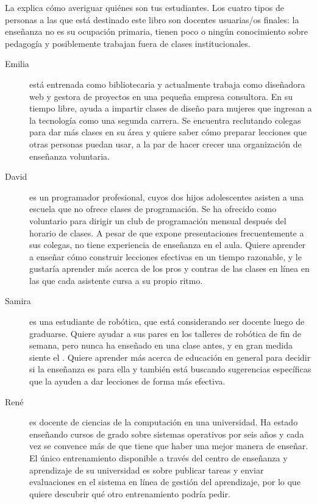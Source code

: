 
La  explica cómo averiguar quiénes son tus estudiantes. 
Los cuatro tipos de personas a las que está destinado este libro son docentes usuarias/os finales: 
la enseñanza no es su ocupación primaria, tienen poco o ningún conocimiento sobre pedagogía y 
posiblemente trabajan fuera de clases institucionales.

\begin{description}

\item[Emilia]
está entrenada como bibliotecaria
y actualmente trabaja como diseñadora web y gestora de proyectos en una pequeña empresa consultora.
En su tiempo libre, ayuda a impartir clases de diseño para mujeres que ingresan a la tecnología como una segunda carrera.
Se encuentra reclutando colegas para dar más clases en su área
y quiere saber cómo preparar lecciones que otras personas puedan usar,
a la par de hacer crecer una organización de enseñanza voluntaria.

\item[David]
es un programador profesional, cuyos dos hijos adolescentes
asisten a una escuela que no ofrece clases de programación.
Se ha ofrecido como voluntario para dirigir un club de programación mensual después del horario de clases.
A pesar de que expone presentaciones frecuentemente a sus colegas,
no tiene experiencia de enseñanza en el aula.
Quiere aprender a enseñar cómo construir lecciones efectivas en un tiempo razonable,
y le gustaría aprender más acerca de los pros y contras de las clases en línea en las que cada asistente cursa a su propio ritmo.

\item[Samira]
es una estudiante de robótica, que está considerando ser docente luego de graduarse.
Quiere ayudar a sus pares en los talleres de robótica de fin de semana,
pero nunca ha enseñado en una clase antes,
y en gran medida siente el .
Quiere aprender más acerca de educación en general para decidir si la enseñanza es para ella
y también está buscando sugerencias específicas que la ayuden a dar lecciones 
de forma más efectiva. 

\item[René]
es docente de ciencias de la computación en una universidad.
Ha estado enseñando cursos de grado sobre sistemas operativos por seis años
y cada vez se convence más de que tiene que haber una mejor manera de enseñar.
El único entrenamiento disponible a través del centro de enseñanza y aprendizaje de su universidad 
es sobre publicar tareas y enviar evaluaciones en el sistema en línea de gestión del aprendizaje,
por lo que quiere descubrir qué otro entrenamiento podría pedir.

\end{description}
